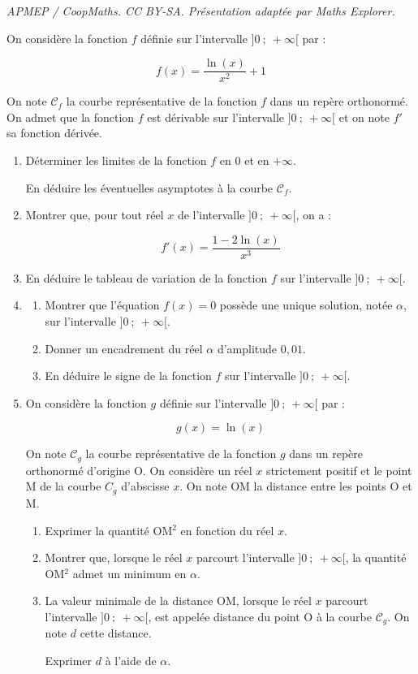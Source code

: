 \documentclass[10pt]{article}
\begin{document}
\noindent\textit{APMEP / CoopMaths. CC BY-SA. Présentation adaptée par Maths Explorer.}\par\medskip
On considère la fonction $f$ définie sur l'intervalle $]0~;~+\infty[$ par :

\[f(x) = \dfrac{\ln (x)}{x^{2}} + 1\]

On note $\mathcal{C}_{f}$ la courbe représentative de la fonction $f$ dans un repère orthonormé. On admet que la fonction $f$ est dérivable sur l'intervalle $]0~;~ +\infty[$ et on note $f'$ sa fonction dérivée.

\medskip

\begin{enumerate}
\item Déterminer les limites de la fonction $f$ en $0$ et en $+\infty$.

En déduire les éventuelles asymptotes à la courbe $\mathcal{C}_{f}$.
\item Montrer que, pour tout réel $x$ de l'intervalle $]0~;~ +\infty[$, on a :

\[f'(x) = \dfrac{1 - 2\ln(x)}{x^{3}}\]

\item En déduire le tableau de variation de la fonction $f$ sur l'intervalle $]0~;~ +\infty[$.

\item 
	\begin{enumerate}
		\item Montrer que l'équation $f(x) = 0$ possède une unique solution, notée $\alpha$, sur l'intervalle $]0~;~ +\infty[$.
		\item Donner un encadrement du réel $\alpha$ d'amplitude $0,01$.
		\item En déduire le signe de la fonction $f$ sur l'intervalle $]0~;~ +\infty[$.
	\end{enumerate}
\item On considère la fonction $g$ définie sur l'intervalle $]0~;~ +\infty[$ par :

\[g(x) = \ln(x)\]

On note $\mathcal{C}_{g}$ la courbe représentative de la fonction $g$ dans un repère orthonormé d'origine O. On considère un réel $x$ strictement positif et le point M de la courbe $C_{g}$ d'abscisse $x$. On note OM la distance entre les points O et M.

	\begin{enumerate}
		\item Exprimer la quantité OM$^{2}$ en fonction du réel $x$.
		\item Montrer que, lorsque le réel $x$ parcourt l'intervalle $]0~;~ +\infty[$, la quantité OM$^{2}$ admet un minimum en $\alpha$.
		\item La valeur minimale de la distance OM, lorsque le réel $x$ parcourt l'intervalle $]0~;~+\infty[$, est appelée distance du point O à la courbe $\mathcal{C}_{g}$. On note $d$ cette distance.

Exprimer $d$ à l'aide de $\alpha$.
	\end{enumerate}
\end{enumerate}
\end{document}
